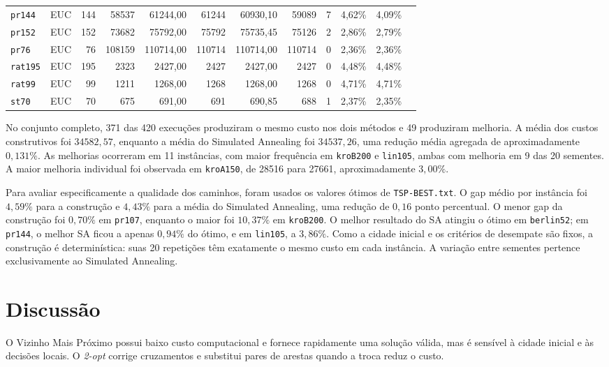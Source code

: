 \documentclass[12pt,a4paper]{article}
\begin{document}
\begin{longtable}{@{}lrrrrrrrrrrr@{}}
\texttt{pr144} & EUC & 144 & 58537 & 61244,00 & 61244 & 60930,10 & 59089 & 7 & 4,62\% & 4,09\% \\
\texttt{pr152} & EUC & 152 & 73682 & 75792,00 & 75792 & 75735,45 & 75126 & 2 & 2,86\% & 2,79\% \\
\texttt{pr76} & EUC & 76 & 108159 & 110714,00 & 110714 & 110714,00 & 110714 & 0 & 2,36\% & 2,36\% \\
\texttt{rat195} & EUC & 195 & 2323 & 2427,00 & 2427 & 2427,00 & 2427 & 0 & 4,48\% & 4,48\% \\
\texttt{rat99} & EUC & 99 & 1211 & 1268,00 & 1268 & 1268,00 & 1268 & 0 & 4,71\% & 4,71\% \\
\texttt{st70} & EUC & 70 & 675 & 691,00 & 691 & 690,85 & 688 & 1 & 2,37\% & 2,35\% \\
\end{longtable}
\endgroup

No conjunto completo, 371 das 420 execuções produziram o mesmo custo nos dois métodos e 49 produziram melhoria. A média dos custos construtivos foi $34582,57$, enquanto a média do Simulated Annealing foi $34537,26$, uma redução média agregada de aproximadamente $0,131\%$. As melhorias ocorreram em 11 instâncias, com maior frequência em \texttt{kroB200} e \texttt{lin105}, ambas com melhoria em 9 das 20 sementes. A maior melhoria individual foi observada em \texttt{kroA150}, de 28516 para 27661, aproximadamente $3,00\%$.

Para avaliar especificamente a qualidade dos caminhos, foram usados os valores ótimos de \texttt{TSP-BEST.txt}. O gap médio por instância foi $4,59\%$ para a construção e $4,43\%$ para a média do Simulated Annealing, uma redução de $0,16$ ponto percentual. O menor gap da construção foi $0,70\%$ em \texttt{pr107}, enquanto o maior foi $10,37\%$ em \texttt{kroB200}. O melhor resultado do SA atingiu o ótimo em \texttt{berlin52}; em \texttt{pr144}, o melhor SA ficou a apenas $0,94\%$ do ótimo, e em \texttt{lin105}, a $3,86\%$. Como a cidade inicial e os critérios de desempate são fixos, a construção é determinística: suas 20 repetições têm exatamente o mesmo custo em cada instância. A variação entre sementes pertence exclusivamente ao Simulated Annealing.

\section{Discussão}
O Vizinho Mais Próximo possui baixo custo computacional e fornece rapidamente uma solução válida, mas é sensível à cidade inicial e às decisões locais. O \textit{2-opt} corrige cruzamentos e substitui pares de arestas quando a troca reduz o custo.
\end{document}

